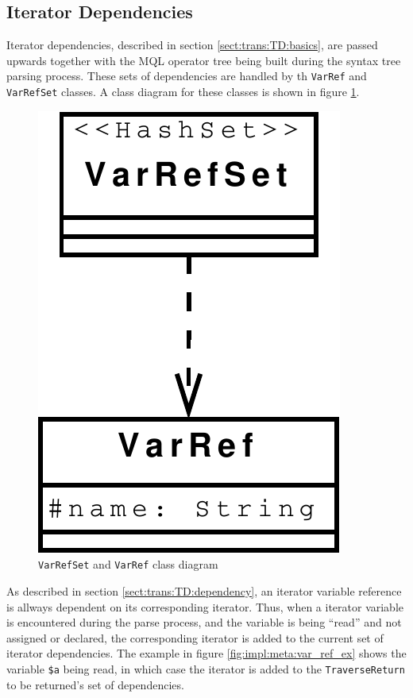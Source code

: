 \subsection{Iterator Dependencies}
Iterator dependencies, described in section \ref{sect:trans:TD:basics}, are
passed upwards together with the MQL operator tree being built during the syntax
tree parsing process. These sets of dependencies are handled by th \texttt{VarRef} and \texttt{VarRefSet} classes.
A class diagram for these classes is shown in figure \ref{fig:impl:meta:varrefset_uml}.

\begin{figure}[!htp]
\begin{center}
  \includegraphics[scale=0.5]{diagrams/varrefset_uml}
  \caption{\texttt{VarRefSet} and \texttt{VarRef} class diagram}
  \label{fig:impl:meta:varrefset_uml}
\end{center}
\end{figure}

As described in section \ref{sect:trans:TD:dependency}, an iterator variable reference is allways dependent on
its corresponding iterator. Thus, when a iterator variable is encountered during the parse process, and the
variable is being ``read'' and not assigned or declared, the corresponding iterator is added to the current set of
iterator dependencies. The example in figure \ref{fig:impl:meta:var_ref_ex} shows the variable \texttt{\$a}
being read, in which case the iterator is added to the \texttt{TraverseReturn} to be returned's set of
dependencies.

